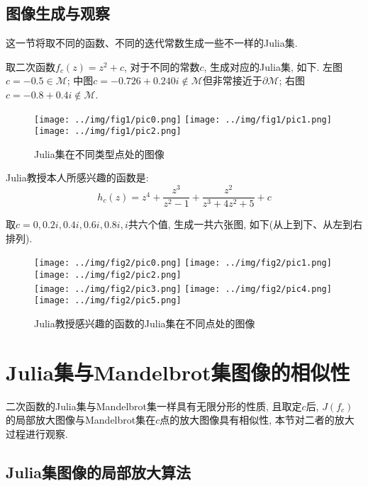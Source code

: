 \documentclass[UTF8]{ctexart}
\begin{document}
\subsection{图像生成与观察}

这一节将取不同的函数、不同的迭代常数生成一些不一样的Julia集.

取二次函数$f_c(z)=z^2+c$, 对于不同的常数$c$, 生成对应的Julia集, 如下. 左图$c=-0.5\in\mathcal{M}$; 中图$c=-0.726+0.240i\notin \mathcal{M}$但非常接近于$\partial \mathcal{M}$; 右图$c=-0.8+0.4i\notin \mathcal{M}$.

\begin{figure}[H]
    \centering
    \texttt{[image: ../img/fig1/pic0.png]}
    \texttt{[image: ../img/fig1/pic1.png]}
    \texttt{[image: ../img/fig1/pic2.png]}
    \caption{Julia集在不同类型点处的图像}
\end{figure}

Julia教授本人所感兴趣的函数是: \cite{2019ComplexAnalysis} 
\begin{equation*}
    h_c(z)=z^4+\frac{z^3}{z^2-1}+\frac{z^2}{z^3+4z^2+5}+c
\end{equation*}

取$c=0,0.2i,0.4i,0.6i,0.8i,i$共六个值, 生成一共六张图, 如下(从上到下、从左到右排列).

\begin{figure}[H]
    \centering
    \texttt{[image: ../img/fig2/pic0.png]}
    \texttt{[image: ../img/fig2/pic1.png]}
    \texttt{[image: ../img/fig2/pic2.png]}
    \\
    \centering
    \vspace{3pt} \texttt{[image: ../img/fig2/pic3.png]}
    \texttt{[image: ../img/fig2/pic4.png]}
    \texttt{[image: ../img/fig2/pic5.png]}
    \caption{Julia教授感兴趣的函数的Julia集在不同点处的图像}
\end{figure}

\section{Julia集与Mandelbrot集图像的相似性}

二次函数的Julia集与Mandelbrot集一样具有无限分形的性质, 且取定$c$后, $J(f_c)$的局部放大图像与Mandelbrot集在$c$点的放大图像具有相似性, 本节对二者的放大过程进行观察. 

\subsection{Julia集图像的局部放大算法}
\end{document}
